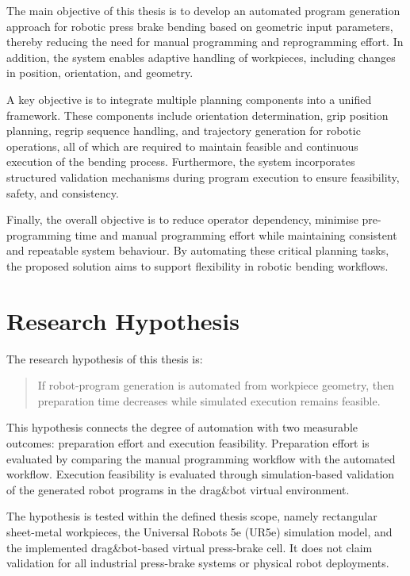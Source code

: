 The main objective of this thesis is to develop an automated program generation approach for robotic press brake bending based on geometric input parameters, thereby reducing the need for manual programming and reprogramming effort. In addition, the system enables adaptive handling of workpieces, including changes in position, orientation, and geometry.

A key objective is to integrate multiple planning components into a unified framework. These components include orientation determination, grip position planning, regrip sequence handling, and trajectory generation for robotic operations, all of which are required to maintain feasible and continuous execution of the bending process. Furthermore, the system incorporates structured validation mechanisms during program execution to ensure feasibility, safety, and consistency.

Finally, the overall objective is to reduce operator dependency, minimise pre-programming time and manual programming effort while maintaining consistent and repeatable system behaviour. By automating these critical planning tasks, the proposed solution aims to support flexibility in robotic bending workflows.

\section{Research Hypothesis}
\label{sec:research-hypothesis}

The research hypothesis of this thesis is:

\begin{quote}
If robot-program generation is automated from workpiece geometry, then preparation time decreases while simulated execution remains feasible.
\end{quote}

This hypothesis connects the degree of automation with two measurable outcomes: preparation effort and execution feasibility. Preparation effort is evaluated by comparing the manual programming workflow with the automated workflow. Execution feasibility is evaluated through simulation-based validation of the generated robot programs in the drag\&bot virtual environment.

The hypothesis is tested within the defined thesis scope, namely rectangular sheet-metal workpieces, the Universal Robots 5e (UR5e) simulation model, and the implemented drag\&bot-based virtual press-brake cell. It does not claim validation for all industrial press-brake systems or physical robot deployments.

